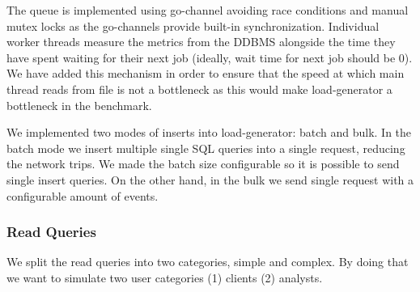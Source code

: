 \begin{figure}[ht]
	\label{fig:load-generator-diagram}
	\caption{}
\end{figure}

The queue is implemented using go-channel avoiding race conditions and manual mutex locks as the go-channels provide built-in synchronization.
Individual worker threads measure the metrics from the DDBMS alongside the time they have spent waiting for their next job (ideally, wait time for next job should be 0).
We have added this mechanism in order to ensure that the speed at which main thread reads from file is not a bottleneck as this would make load-generator a bottleneck in the benchmark.

We implemented two modes of inserts into load-generator: batch and bulk.
In the batch mode we insert multiple single SQL queries into a single request, reducing the network trips.
We made the batch size configurable so it is possible to send single insert queries.
On the other hand, in the bulk we send single request with a configurable amount of events.

\subsubsection{Read Queries}

We split the read queries into two categories, simple and complex.
By doing that we want to simulate two user categories (1) clients (2) analysts.

